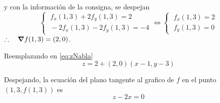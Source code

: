 \begin{solution}
    y con la información de la consigna, se despejan
    \[\begin{cases}
            \;f_x(1,3) + 2f_y(1,3)=2 \\[5pt]
            \;-2f_x(1,3)- 2f_y(1,3)=-4
        \end{cases}
        \iff
        \begin{cases}
            \;f_x(1,3)=2 \\[5pt]
            \;f_y(1,3)=0
        \end{cases}
    \]
    $\therefore\quad\grad f(1,3)=(2,0)$.

       Reemplazando en \eqref{eq:zNabla}
      \[
        z= 2 + (2,0)(x-1,y-3)
    \]


        Despejando, la ecuación del plano tangente al grafico de $f$ en el punto $(1,3,f(1,3))$ es
          \[
         z -2x = 0
    \]
 
\newpage
\end{solution}

